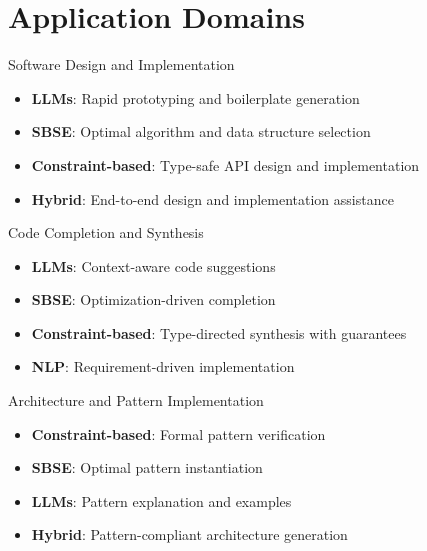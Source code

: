 \documentclass{beamer}
\begin{document}
\section{Application Domains}
\begin{frame}[t]{Software Design and Implementation}
\begin{itemize}
\item \textbf{LLMs}: Rapid prototyping and boilerplate generation
\item \textbf{SBSE}: Optimal algorithm and data structure selection
\item \textbf{Constraint-based}: Type-safe API design and implementation
\item \textbf{Hybrid}: End-to-end design and implementation assistance
\end{itemize}
\end{frame}

\begin{frame}[t]{Code Completion and Synthesis}
\begin{itemize}
\item \textbf{LLMs}: Context-aware code suggestions
\item \textbf{SBSE}: Optimization-driven completion
\item \textbf{Constraint-based}: Type-directed synthesis with guarantees
\item \textbf{NLP}: Requirement-driven implementation
\end{itemize}
\end{frame}

\begin{frame}[t]{Architecture and Pattern Implementation}
\begin{itemize}
\item \textbf{Constraint-based}: Formal pattern verification
\item \textbf{SBSE}: Optimal pattern instantiation
\item \textbf{LLMs}: Pattern explanation and examples
\item \textbf{Hybrid}: Pattern-compliant architecture generation
\end{itemize}
\end{frame}
\end{document}
